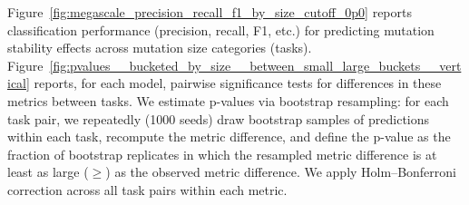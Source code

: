 Figure~\ref{fig:megascale_precision_recall_f1_by_size_cutoff_0p0} reports classification performance
(precision, recall, F1, etc.) for predicting mutation stability effects across mutation size
categories (tasks).
Figure~\ref{fig:pvalues__bucketed_by_size__between_small_large_buckets__vertical} reports, for each
model, pairwise significance tests for differences in these metrics between tasks. We estimate
p-values via bootstrap resampling: for each task pair, we repeatedly (1000 seeds) draw bootstrap
samples of predictions within each task, recompute the metric difference, and define the p-value as
the fraction of bootstrap replicates in which the resampled metric difference is at least as large
($\geq$) as the observed metric difference. We apply Holm–Bonferroni correction across all task
pairs within each metric.\\



